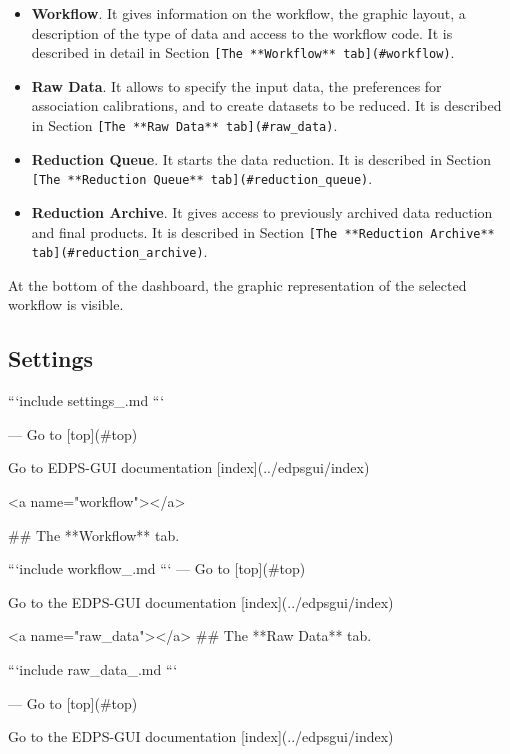 \begin{itemize}
\item {\bf Workflow}. It gives information on the workflow, the graphic
  layout, a description of the type of data and access to the workflow
  code. It is described in detail in Section
  \verb|[The **Workflow** tab](#workflow)|.

\item {\bf Raw Data}. It allows to specify the input data, the preferences
  for association calibrations, and to create datasets to be reduced. It
  is described in Section
  \verb|[The **Raw Data** tab](#raw_data)|.

\item {\bf Reduction Queue}. It starts the data reduction. It is described in
  Section
  \verb|[The **Reduction Queue** tab](#reduction_queue)|.

\item {\bf Reduction Archive}. It gives access to previously archived data
  reduction and final products. It is described in Section
  \verb|[The **Reduction Archive** tab](#reduction_archive)|.
\end{itemize}

At the bottom of the dashboard, the graphic representation of the
selected workflow is visible.




\subsection{Settings}
\label{sec:settings}


```{include} settings_.md
```

---
Go to [top](#top)

Go to EDPS-GUI documentation [index](../edpsgui/index)

<a name="workflow"></a>

## The **Workflow** tab.


```{include} workflow_.md
```
---
Go to [top](#top)

Go to the EDPS-GUI documentation [index](../edpsgui/index)

<a name="raw_data"></a>
## The **Raw Data** tab.


```{include} raw_data_.md
```

---
Go to [top](#top)

Go to the EDPS-GUI documentation [index](../edpsgui/index)

